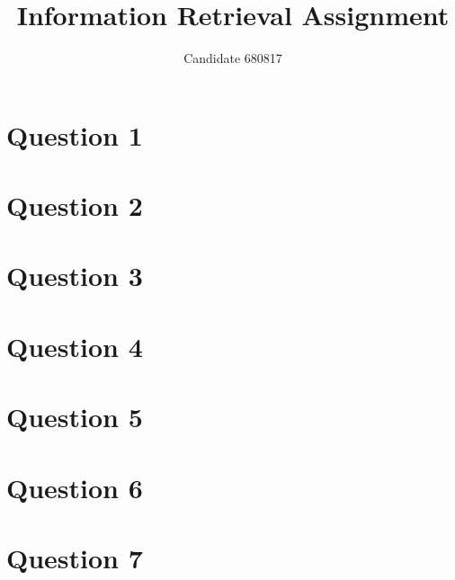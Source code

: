 \documentclass[11pt]{article}
\begin{document}
\title{Information Retrieval Assignment}
\author{Candidate 680817}
\maketitle

\section*{Question 1}


\section*{Question 2}

\section*{Question 3}



\section*{Question 4}




\section*{Question 5}


\section*{Question 6}



\section*{Question 7}
\end{document}
